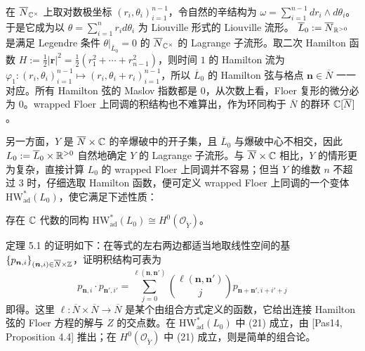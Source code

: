 在 $\overline{N}_{\mathbb{C}^\times}$ 上取对数极坐标 $(r_i,\theta_i)_{i=1}^{n-1}$，令自然的辛结构为 $\omega=\sum_{i=1}^{n-1}dr_i\wedge d\theta_i$。于是它成为以 $\theta=\sum_{i=1}^{n}r_id\theta_i$ 为 Liouville 形式的 Liouville 流形。
$\overline{L}_0:=\overline{N}_{\mathbb{R}^{>0}}$ 是满足 Legendre 条件 $\theta|_{\overline{L}_0}=0$ 的 $\overline{N}_{\mathbb{C}^\times}$ 的 Lagrange 子流形。取二次 Hamilton 函数 $H:=\frac{1}{2}|\bm r|^2=\frac{1}{2}(r_1^2+\cdots+r_{n-1}^2)$，则时间 $1$ 的 Hamilton 流为 $\varphi_1:(r_i,\theta_i)_{i=1}^{n-1}\mapsto(r_i,\theta_i+r_i)_{i=1}^{n-1}$，所以 $\overline{L}_0$ 的 Hamilton 弦与格点 $\bm n\in\overline{N}$ 一一对应。所有 Hamilton 弦的 Maslov 指数都是 $0$，从次数上看，Floer 复形的微分必为 $0$。wrapped Floer 上同调的积结构也不难算出，作为环同构于 $\overline{N}$ 的群环 $\mathbb{C}[\overline{N}]$。

另一方面，$Y$ 是 $\overline{N}\times\mathbb{C}$ 的辛爆破中的开子集，且 $\overline{L}_0$ 与爆破中心不相交，因此 $L_0:=\overline{L}_0\times\mathbb{R}^{>0}$ 自然地确定 $Y$ 的 Lagrange 子流形。与 $\overline{N}\times\mathbb{C}$ 相比，$Y$ 的情形更为复杂，直接计算 $L_0$ 的 wrapped Floer 上同调并不容易；但当 $Y$ 的维数 $n$ 不超过 $3$ 时，仔细选取 Hamilton 函数，便可定义 wrapped Floer 上同调的一个变体 $\mathrm{HW}^*_{\mathrm{ad}}(L_0)$，使它满足下述性质：

\begin{theorem}
存在 $\mathbb{C}$ 代数的同构 $\mathrm{HW}^*_{\mathrm{ad}}(L_0)\cong H^0\left(\mathcal O_{\check Y}\right)$。
\end{theorem}

定理 5.1 的证明如下：在等式的左右两边都适当地取线性空间的基 $\{p_{\bm n,i}\}_{(\bm n,i)\in\overline{N}\times\mathbb{Z}}$，证明积结构可表为
\begin{equation}
p_{\bm n,i}\cdot p_{\bm n',i'}=\sum_{j=0}^{\ell(\bm n,\bm n')}\binom{\ell(\bm n,\bm n')}{j}p_{\bm n+\bm n',i+i'+j}
\tag{21}
\end{equation}
\noindent 即得。这里 $\ell:\overline{N}\times\overline{N}\to\overline{N}$ 是某个由组合方式定义的函数，它给出连接 Hamilton 弦的 Floer 方程的解与 $Z$ 的交点数。在 $\mathrm{HW}^*_{\mathrm{ad}}(L_0)$ 中 (21) 成立，由 [Pas14, Proposition 4.4] 推出；在 $H^0\left(\mathcal O_{\check Y}\right)$ 中 (21) 成立，则是简单的组合论。

